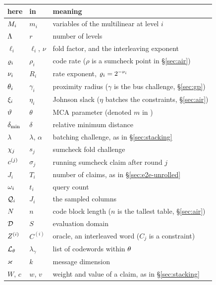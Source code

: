 \begin{center}\small
\begin{tabular}{@{}lll@{}}
\hline
here & in \cite{ACFY25,NA25,BCHKS25} & meaning\\
\hline
$M_i$        & $m_i$        & variables of the multilinear at level $i$\\
$\Lambda$        & $r$          & number of levels\\
$\ell_i$       & $\ell_i$, $\nu$ & fold factor, and the interleaving exponent\\
$\varrho_i$      & $\rho_i$     & code rate ($\rho$ is a sumcheck point in \S\ref{sec:air})\\
$\nu_i$      & $R_i$        & rate exponent, $\varrho_i=2^{-\nu_i}$\\
$\theta_i$       & $\gamma_i$   & proximity radius ($\gamma$ is the bus challenge, \S\ref{sec:gp})\\
$\xi_i$     & $\eta_i$     & Johnson slack ($\eta$ batches the constraints, \S\ref{sec:air})\\
$\vartheta$      & $\theta$     & MCA parameter (denoted $m$ in \cite{BCHKS25})\\
$\delta_{\min}$        & $\delta$     & relative minimum distance\\
$\lambda$      & $\lambda$, $\alpha$ & batching challenge, as in \S\ref{sec:stacking}\\
$\chi_j$        & $s_j$        & sumcheck fold challenge\\
$c^{(j)}$       & $\sigma_j$   & running sumcheck claim after round $j$\\
$J_i$          & $T_i$        & number of claims, as in \S\ref{sec:e2e-unrolled}\\
$\omega_i$        & $t_i$        & query count\\
$\mathcal{Q}_i$      & $J_i$        & the sampled columns\\
$N$        & $n$          & code block length ($n$ is the tallest table, \S\ref{sec:air})\\
$\mathcal{D}$         & $S$          & evaluation domain\\
$Z^{(i)}$   & $C^{(i)}$    & oracle, an interleaved word ($C_j$ is a constraint)\\
$\mathcal{L}_{\theta}$  & $\lambda_\gamma$ & list of codewords within $\theta$\\
$\varkappa$        & $k$          & message dimension\\
$W$, $c$       & $w$, $v$     & weight and value of a claim, as in \S\ref{sec:stacking}\\

\end{tabular}
\end{center}
